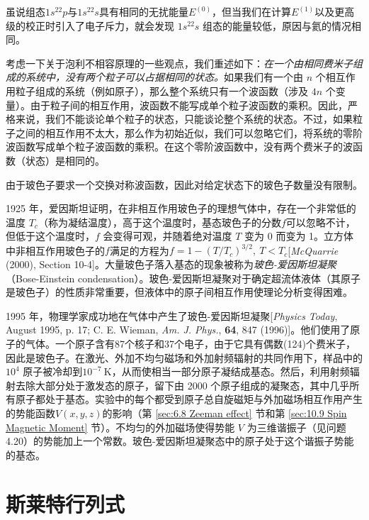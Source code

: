     虽说组态$1s^22p$与$1s^22s$具有相同的无扰能量$E^{\left(0\right)}$，但当我们在计算$E^{\left(1\right)}$以及更高级的校正时引入了电子斥力，就会发现 $1s^22s$ 组态的能量较低，原因与氦的情况相同。

    考虑一下关于泡利不相容原理的一些观点，我们重述如下：\textit{在一个由相同费米子组成的系统中，没有两个粒子可以占据相同的状态。}如果我们有一个由 $n$ 个相互作用粒子组成的系统（例如原子），那么整个系统只有一个波函数（涉及 $4n$ 个变量）。由于粒子间的相互作用，波函数不能写成单个粒子波函数的乘积。因此，严格来说，我们不能谈论单个粒子的状态，只能谈论整个系统的状态。不过，如果粒子之间的相互作用不太大，那么作为初始近似，我们可以忽略它们，将系统的零阶波函数写成单个粒子波函数的乘积。在这个零阶波函数中，没有两个费米子的波函数（状态）是相同的。

    由于玻色子要求一个交换对称波函数，因此对给定状态下的玻色子数量没有限制。

    1925 年，爱因斯坦证明，在非相互作用玻色子的理想气体中，存在一个非常低的温度 $T_c$（称为凝结温度），高于这个温度时，基态玻色子的分数$f$可以忽略不计，但低于这个温度时，$f$ 会变得可观，并随着绝对温度 $T$ 变为 0 而变为 1。立方体中非相互作用玻色子的$f$满足的方程为$f = 1 - \left(T/T_c\right)^{3/2}, \: T < T_c$[\textit{McQuarrie} (2000), Section 10-4]。大量玻色子落入基态的现象被称为\textit{玻色-爱因斯坦凝聚}（Bose-Einstein condensation）。玻色-爱因斯坦凝聚对于确定超流体液体（其原子是玻色子）的性质非常重要，但液体中的原子间相互作用使理论分析变得困难。

    1995 年，物理学家成功地在气体中产生了玻色-爱因斯坦凝聚[\textit{Physics Today}, August 1995, p. 17; C. E. Wieman, \textit{Am. J. Phys.}, \textbf{64}, 847 (1996)]。他们使用了原子的气体。一个原子含有87个核子和37个电子，由于它具有偶数(124)个费米子，因此是玻色子。在激光、外加不均匀磁场和外加射频辐射的共同作用下，样品中的$10^4$ 原子被冷却到$10^{-7} \: \mathrm{K}$，从而使相当一部分原子凝结成基态。然后，利用射频辐射去除大部分处于激发态的原子，留下由 2000 个原子组成的凝聚态，其中几乎所有原子都处于基态。实验中的每个都受到原子总自旋磁矩与外加磁场相互作用产生的势能函数$V\left(x,y,z\right)$的影响（第 \ref{sec:6.8 Zeeman effect} 节和第 \ref{sec:10.9 Spin Magnetic Moment} 节）。不均匀的外加磁场使得势能 $V$ 为三维谐振子（见问题4.20）的势能加上一个常数。玻色-爱因斯坦凝聚态中的原子处于这个谐振子势能的基态。

\section{斯莱特行列式}
\label{sec:10.6 Slater Determinants}

